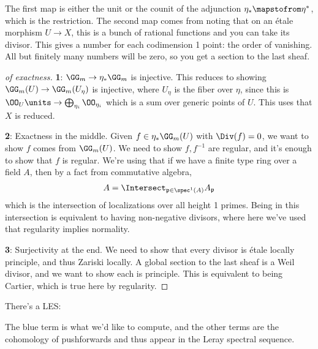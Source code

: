 \begin{remark}

The first map is either the unit or the counit of the adjunction
\(\eta_* \mapstofrom \eta^*\), which is the restriction. The second map
comes from noting that on an étale morphism \(U\to X\), this is a bunch
of rational functions and you can take its divisor. This gives a number
for each codimension 1 point: the order of vanishing. All but finitely
many numbers will be zero, so you get a section to the last sheaf.

\end{remark}

\begin{proof}[of exactness]

\textbf{1}: \(\GG_m \to \eta_* \GG_m\) is injective. This reduces to
showing \(\GG_m(U) \to \GG_m(U_\eta)\) is injective, where \(U_\eta\) is
the fiber over \(\eta\), since this is
\(\OO_U\units \to \bigoplus_{\eta_i} \OO_{\eta_i}\) which is a sum over
generic points of \(U\). This uses that \(X\) is reduced.

\textbf{2}: Exactness in the middle. Given \(f\in \eta_* \GG_m(U)\) with
\(\Div(f) = 0\), we want to show \(f\) comes from \(\GG_m(U)\). We need
to show \(f, f^{-1}\) are regular, and it's enough to show that \(f\) is
regular. We're using that if we have a finite type ring over a field
\(A\), then by a fact from commutative algebra,
\begin{align*}
A = \Intersect_{\mathfrak{p}\in \spec^1(A)} A_{\mathfrak{p}}
\end{align*} which is the intersection of localizations over all height
1 primes. Being in this intersection is equivalent to having
non-negative divisors, where here we've used that regularity implies
normality.

\textbf{3}: Surjectivity at the end. We need to show that every divisor
is étale locally principle, and thus Zariski locally. A global section
to the last sheaf is a Weil divisor, and we want to show each is
principle. This is equivalent to being Cartier, which is true here by
regularity.

\end{proof}

\begin{corollary}[?]

There's a LES:

\begin{center}
\end{center}

The blue term is what we'd like to compute, and the other terms are the
cohomology of pushforwards and thus appear in the Leray spectral
sequence.

\end{corollary}

